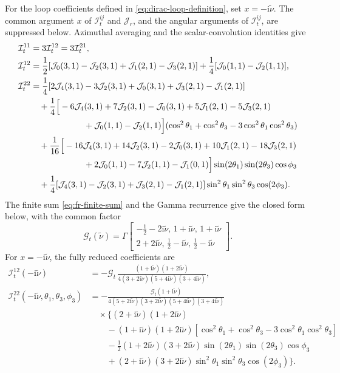 \documentclass[a4paper,12pt]{article}
\def\ii{\mathrm{i}}
\def\tn{\tilde\nu}
\begin{document}
For the loop coefficients defined in \eqref{eq:dirac-loop-definition}, set $x=-\ii\tn$.
The common argument $x$ of $\mathcal I^{ij}_{t}$ and $\mathcal J_r$, and the angular arguments of $\mathcal I^{ij}_{t}$, are suppressed below.
Azimuthal averaging and the scalar-convolution identities give
\begin{align}
 \mathcal I^{11}_{t}
 &=3\mathcal I^{12}_{t}=3\mathcal I^{21}_{t},
 \nonumber\\
 \mathcal I^{12}_{t}
 &=\frac12[\mathcal J_0(3,1)-\mathcal J_2(3,1)
 +\mathcal J_1(2,1)-\mathcal J_3(2,1)]
 +\frac14[\mathcal J_0(1,1)-\mathcal J_2(1,1)],
 \nonumber\\
 \mathcal I^{22}_{t}
 &=\frac14[2\mathcal J_4(3,1)-3\mathcal J_2(3,1)+\mathcal J_0(3,1)
 +\mathcal J_3(2,1)-\mathcal J_1(2,1)]\nonumber\\
 &\quad+\frac14\Big[-6\mathcal J_4(3,1)+7\mathcal J_2(3,1)-\mathcal J_0(3,1)
 +5\mathcal J_1(2,1)-5\mathcal J_3(2,1)\nonumber\\
 &\hspace{22mm}+\mathcal J_0(1,1)-\mathcal J_2(1,1)\Big]
 (\cos^2\theta_1+\cos^2\theta_3-3\cos^2\theta_1\cos^2\theta_3)\nonumber\\
 &\quad+\frac1{16}\Big[-16\mathcal J_4(3,1)+14\mathcal J_2(3,1)-2\mathcal J_0(3,1)
 +10\mathcal J_1(2,1)-18\mathcal J_3(2,1)\nonumber\\
 &\hspace{22mm}+2\mathcal J_0(1,1)-7\mathcal J_2(1,1)-\mathcal J_1(0,1)\Big]
 \sin(2\theta_1)\sin(2\theta_3)\cos\phi_3\nonumber\\
 &\quad+\frac14[\mathcal J_4(3,1)-\mathcal J_2(3,1)
 +\mathcal J_3(2,1)-\mathcal J_1(2,1)]
 \sin^2\theta_1\sin^2\theta_3\cos(2\phi_3).
 \label{eq:dirac-loop-reduction}
\end{align}
The finite sum \eqref{eq:fr-finite-sum} and the Gamma recurrence give the closed form below, with the common factor
\begin{equation}
 \mathcal G_{t}(\tn)
 =\Gamma\!\left[\begin{matrix}
 -\tfrac12-2\ii\tn,\,1+\ii\tn,\,1+\ii\tn\\
 2+2\ii\tn,\,\tfrac12-\ii\tn,\,\tfrac12-\ii\tn
 \end{matrix}\right].
 \label{eq:dirac-loop-Gamma}
\end{equation}
For $x=-\ii\tn$, the fully reduced coefficients are
\begin{align}
 \mathcal I^{12}_{t}(-\ii\tn)
 &=-\mathcal G_{t}\,
 \frac{(1+\ii\tn)(1+2\ii\tn)}
 {4(3+2\ii\tn)(5+4\ii\tn)(3+4\ii\tn)},
 \nonumber\\
 \mathcal I^{22}_{t}(-\ii\tn,\theta_1,\theta_3,\phi_3)
 &=-\frac{\mathcal G_{t}(1+\ii\tn)}
 {4(5+2\ii\tn)(3+2\ii\tn)(5+4\ii\tn)(3+4\ii\tn)}
 \nonumber\\
 &\quad\times\Big\{(2+\ii\tn)(1+2\ii\tn)\nonumber\\
 &\qquad-(1+\ii\tn)(1+2\ii\tn)
 [\cos^2\theta_1+\cos^2\theta_3-3\cos^2\theta_1\cos^2\theta_3]\nonumber\\
 &\qquad-\frac12(1+2\ii\tn)(3+2\ii\tn)
 \sin(2\theta_1)\sin(2\theta_3)\cos\phi_3\nonumber\\
 &\qquad+(2+\ii\tn)(3+2\ii\tn)
 \sin^2\theta_1\sin^2\theta_3\cos(2\phi_3)\Big\}.
 \label{eq:dirac-loop-closed}
\end{align}
\end{document}
